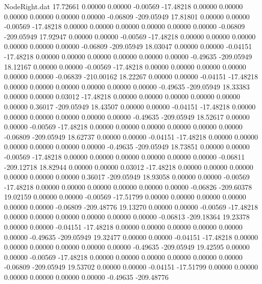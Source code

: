 \begin{filecontents}{NodeRight.dat}
  17.72661    0.00000    0.00000    -0.00569  -17.48218    0.00000    0.00000    0.00000    0.00000    0.00000    0.00000   -0.06809 -209.05949
  17.81801    0.00000    0.00000    -0.00569  -17.48218    0.00000    0.00000    0.00000    0.00000    0.00000    0.00000   -0.06809 -209.05949
  17.92947    0.00000    0.00000    -0.00569  -17.48218    0.00000    0.00000    0.00000    0.00000    0.00000    0.00000   -0.06809 -209.05949
  18.03047    0.00000    0.00000    -0.04151  -17.48218    0.00000    0.00000    0.00000    0.00000    0.00000    0.00000   -0.49635 -209.05949
  18.12167    0.00000    0.00000    -0.00569  -17.48218    0.00000    0.00000    0.00000    0.00000    0.00000    0.00000   -0.06839 -210.00162
  18.22267    0.00000    0.00000    -0.04151  -17.48218    0.00000    0.00000    0.00000    0.00000    0.00000    0.00000   -0.49635 -209.05949
  18.33383    0.00000    0.00000     0.03012  -17.48218    0.00000    0.00000    0.00000    0.00000    0.00000    0.00000    0.36017 -209.05949
  18.43507    0.00000    0.00000    -0.04151  -17.48218    0.00000    0.00000    0.00000    0.00000    0.00000    0.00000   -0.49635 -209.05949
  18.52617    0.00000    0.00000    -0.00569  -17.48218    0.00000    0.00000    0.00000    0.00000    0.00000    0.00000   -0.06809 -209.05949
  18.62737    0.00000    0.00000    -0.04151  -17.48218    0.00000    0.00000    0.00000    0.00000    0.00000    0.00000   -0.49635 -209.05949
  18.73851    0.00000    0.00000    -0.00569  -17.48218    0.00000    0.00000    0.00000    0.00000    0.00000    0.00000   -0.06811 -209.12718
  18.82944    0.00000    0.00000     0.03012  -17.48218    0.00000    0.00000    0.00000    0.00000    0.00000    0.00000    0.36017 -209.05949
  18.93058    0.00000    0.00000    -0.00569  -17.48218    0.00000    0.00000    0.00000    0.00000    0.00000    0.00000   -0.06826 -209.60378
  19.02159    0.00000    0.00000    -0.00569  -17.51799    0.00000    0.00000    0.00000    0.00000    0.00000    0.00000   -0.06809 -209.48776
  19.13270    0.00000    0.00000    -0.00569  -17.48218    0.00000    0.00000    0.00000    0.00000    0.00000    0.00000   -0.06813 -209.18364
  19.23378    0.00000    0.00000    -0.04151  -17.48218    0.00000    0.00000    0.00000    0.00000    0.00000    0.00000   -0.49635 -209.05949
  19.32477    0.00000    0.00000    -0.04151  -17.48218    0.00000    0.00000    0.00000    0.00000    0.00000    0.00000   -0.49635 -209.05949
  19.42595    0.00000    0.00000    -0.00569  -17.48218    0.00000    0.00000    0.00000    0.00000    0.00000    0.00000   -0.06809 -209.05949
  19.53702    0.00000    0.00000    -0.04151  -17.51799    0.00000    0.00000    0.00000    0.00000    0.00000    0.00000   -0.49635 -209.48776

\end{filecontents}
